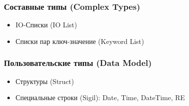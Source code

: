 \documentclass[10pt]{beamer}
\begin{document}
\begin{frame}
  \frametitle{Составные типы (Complex Types)}
  \begin{itemize}
    \item IO-Списки (IO List)
    \item Списки пар ключ-значение (Keyword List)
  \end{itemize}
\end{frame}

\begin{frame}
  \frametitle{Пользовательские типы (Data Model)}
  \begin{itemize}
    \item Структуры (Struct)
    \item Специальные строки (Sigil): Date, Time, DateTime, RE
  \end{itemize}
\end{frame}
\end{document}
